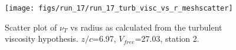 \begin{figure}[H]
\centering
\texttt{[image: figs/run\_17/run\_17\_turb\_visc\_vs\_r\_meshscatter]}
\caption{Scatter plot of $\nu_T$ vs radius as calculated from the turbulent viscosity hypothesis. $z/c$=6.97, $V_{free}$=27.03, station 2.}
\label{fig:run_17_turb_visc_vs_r_meshscatter}
\end{figure}


